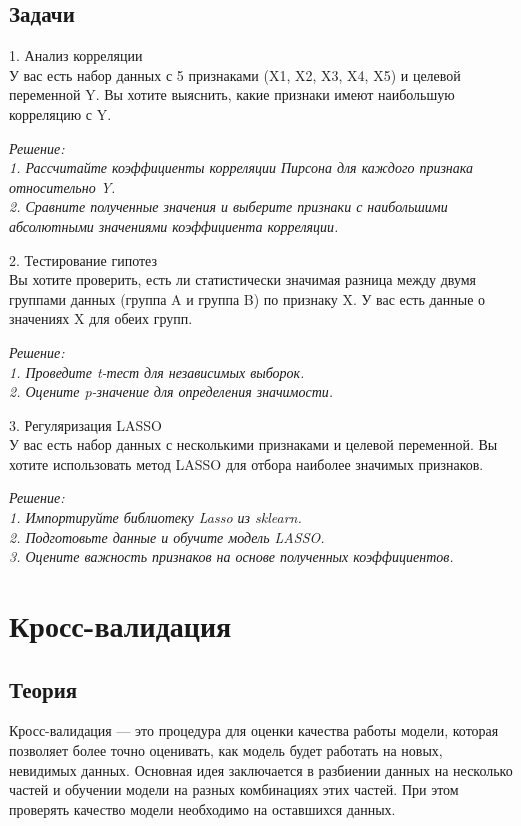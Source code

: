 \subsection{Задачи}

1. Анализ корреляции\\
У вас есть набор данных с 5 признаками (X1, X2, X3, X4, X5) и целевой переменной Y. Вы хотите выяснить, какие признаки имеют наибольшую корреляцию с Y.

\textit{Решение:\\
    1. Рассчитайте коэффициенты корреляции Пирсона для каждого признака относительно Y.\\
    2. Сравните полученные значения и выберите признаки с наибольшими абсолютными значениями коэффициента корреляции.}

2. Тестирование гипотез\\
Вы хотите проверить, есть ли статистически значимая разница между двумя группами данных (группа A и группа B) по признаку X. У вас есть данные о значениях X для обеих групп.

\textit{Решение:\\
    1. Проведите t-тест для независимых выборок.\\
    2. Оцените p-значение для определения значимости.}

3. Регуляризация LASSO \\
У вас есть набор данных с несколькими признаками и целевой переменной. Вы хотите использовать метод LASSO для отбора наиболее значимых признаков.

\textit{Решение:\\
    1. Импортируйте библиотеку Lasso из sklearn.\\
    2. Подготовьте данные и обучите модель LASSO.\\
    3. Оцените важность признаков на основе полученных коэффициентов.\\}


\section{Кросс-валидация}

\subsection{Теория}

Кросс-валидация — это процедура для оценки качества работы модели, которая позволяет более точно оценивать, как модель будет работать на новых, невидимых данных. Основная идея заключается в разбиении данных на несколько частей и обучении модели на разных комбинациях этих частей. При этом  проверять качество модели необходимо на оставшихся данных.

